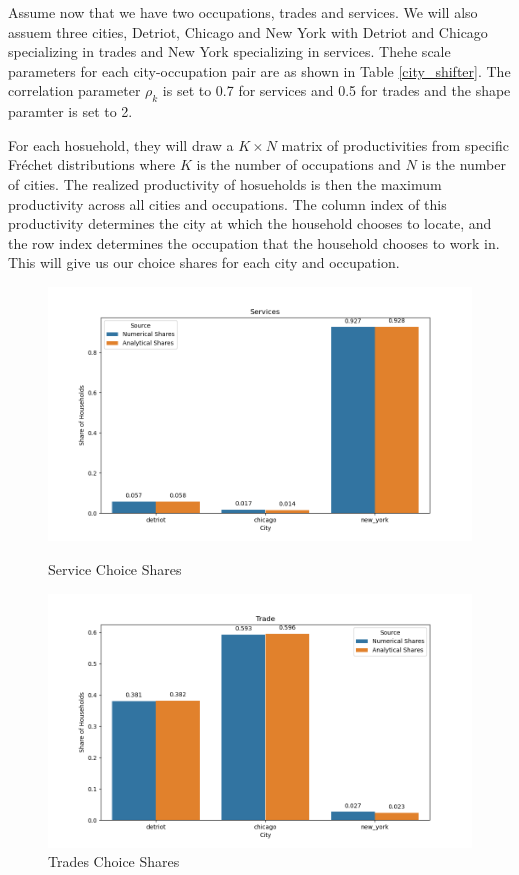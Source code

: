 \documentclass[10pt]{article}
\begin{document}
Assume now that we have two occupations, trades and services. We will also assuem three cities, Detriot, Chicago and New York with Detriot and Chicago specializing in trades and New York specializing in services. Thehe scale parameters for each city-occupation pair are as shown in Table \ref{city_shifter}. The correlation parameter $\rho_k$ is set to 0.7 for services and 0.5 for trades and the shape paramter is set to 2.

For each hosuehold, they will draw a $K \times N$ matrix of productivities from specific Fr\'{e}chet distributions where $K$ is the number of occupations and $N$ is the number of cities. The realized productivity of hosueholds is then the maximum productivity across all cities and occupations. The column index of this productivity determines the city at which the household chooses to locate, and the row index determines the occupation that the household chooses to work in. This will give us our choice shares for each city and occupation.

\begin{figure}[!htb]
    \begin{minipage}{0.5\textwidth}
        \centering
        \includegraphics[width=\textwidth]{../../simulations/graphs/sim_services.png}
        \caption{Service Choice Shares}
        \label{sim_services}
    \end{minipage}
    \begin{minipage}{0.5\textwidth}
        \centering
        \includegraphics[width=\textwidth]{../../simulations/graphs/sim_trade.png}
        \caption{Trades Choice Shares}
        \label{sim_trades}
    \end{minipage}
\end{figure}
\end{document}
